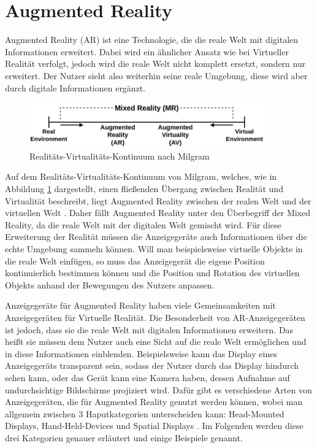   \section{Augmented Reality}
  Augmented Reality (AR) ist eine Technologie, die die reale Welt mit digitalen Informationen erweitert.
  Dabei wird ein ähnlicher Ansatz wie bei Virtueller Realität verfolgt, jedoch wird die reale Welt nicht komplett ersetzt, sondern nur erweitert.
  Der Nutzer sieht also weiterhin seine reale Umgebung, diese wird aber durch digitale Informationen ergänzt.
  \begin{figure}[H]
    \centering
    \includegraphics[width=0.9\textwidth]{images/RV-Continuum.png}
    \caption{Realitäts-Virtualitäts-Kontinuum nach Milgram}
    \label{fig:rv-continuum}
  \end{figure}
  Auf dem Realitäts-Virtualitäts-Kontinuum von Milgram, welches, wie in Abbildung \ref{fig:rv-continuum} dargestellt, einen fließenden Übergang zwischen Realität und Virtualität beschreibt, liegt Augmented Reality zwischen der realen Welt und der virtuellen Welt \autocite[vgl.][S.9]{milgram1999}.
  Daher fällt Augmented Reality unter den Überbegriff der Mixed Reality, da die reale Welt mit der digitalen Welt gemischt wird.
  Für diese Erweiterung der Realität müssen die Anzeigegeräte auch Informationen über die echte Umgebung sammeln können.
  Will man beispielsweise virtuelle Objekte in die reale Welt einfügen, so muss das Anzeigegerät die eigene Position kontinuierlich bestimmen können und die Position und Rotation des virtuellen Objekts anhand der Bewegungen des Nutzers anpassen.

  Anzeigegeräte für Augmented Reality haben viele Gemeinsamkeiten mit Anzeigegeräten für Virtuelle Realität.
  Die Besonderheit von AR-Anzeigegeräten ist jedoch, dass sie die reale Welt mit digitalen Informationen erweitern.
  Das heißt sie müssen dem Nutzer auch eine Sicht auf die reale Welt ermöglichen und in diese Informationen einblenden.
  Beispielsweise kann das Display eines Anzeigegeräts transparent sein, sodass der Nutzer durch das Display hindurch sehen kann, oder das Gerät kann eine Kamera haben, dessen Aufnahme auf undurchsichtige Bildschirme projiziert wird.
  Dafür gibt es verschiedene Arten von Anzeigegeräten, die für Augmented Reality genutzt werden können, wobei man allgemein zwischen 3 Haputkategorien unterscheiden kann: Head-Mounted Displays, Hand-Held-Devices und Spatial Displays \autocite[][S. 346]{Carmigniani2011}.
  Im Folgenden werden diese drei Kategorien genauer erläutert und einige Beispiele genannt.

